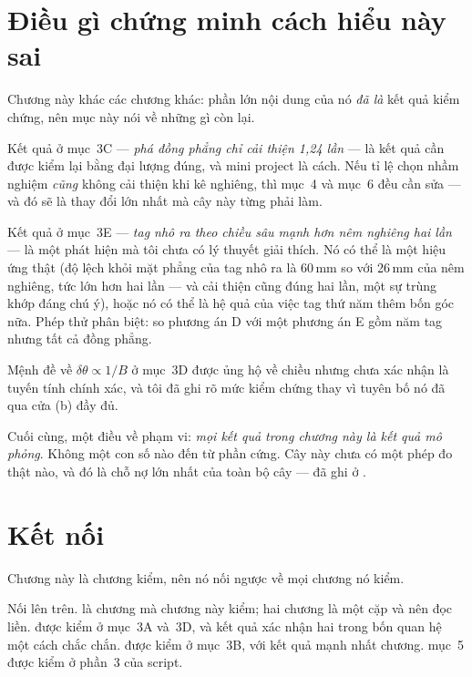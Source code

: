 \documentclass[../../marker.tex]{subfiles}
\begin{document}
\section{Điều gì chứng minh cách hiểu này sai}

Chương này khác các chương khác: phần lớn nội dung của nó \emph{đã là} kết quả kiểm chứng, nên mục này nói về những gì còn lại.

Kết quả ở mục~3C --- \emph{phá đồng phẳng chỉ cải thiện 1,24 lần} --- là kết quả cần được kiểm lại bằng đại lượng đúng, và mini project là cách. Nếu tỉ lệ chọn nhầm nghiệm \emph{cũng} không cải thiện khi kê nghiêng, thì  mục~4 và  mục~6 đều cần sửa --- và đó sẽ là thay đổi lớn nhất mà cây này từng phải làm.

Kết quả ở mục~3E --- \emph{tag nhô ra theo chiều sâu mạnh hơn nêm nghiêng hai lần} --- là một phát hiện mà tôi chưa có lý thuyết giải thích. Nó có thể là một hiệu ứng thật (độ lệch khỏi mặt phẳng của tag nhô ra là 60\,mm so với 26\,mm của nêm nghiêng, tức lớn hơn hai lần --- và cải thiện cũng đúng hai lần, một sự trùng khớp đáng chú ý), hoặc nó có thể là hệ quả của việc tag thứ năm thêm bốn góc nữa. Phép thử phân biệt: so phương án D với một phương án E gồm năm tag nhưng tất cả đồng phẳng.

Mệnh đề về \(\delta\theta \propto 1/B\) ở mục~3D được ủng hộ về chiều nhưng chưa xác nhận là tuyến tính chính xác, và tôi đã ghi rõ mức kiểm chứng thay vì tuyên bố nó đã qua cửa (b) đầy đủ.

Cuối cùng, một điều về phạm vi: \emph{mọi kết quả trong chương này là kết quả mô phỏng}. Không một con số nào đến từ phần cứng. Cây này chưa có một phép đo thật nào, và đó là chỗ nợ lớn nhất của toàn bộ cây --- đã ghi ở .

\section{Kết nối}

Chương này là chương kiểm, nên nó nối ngược về mọi chương nó kiểm.

Nối lên trên.  là chương mà chương này kiểm; hai chương là một cặp và nên đọc liền.  được kiểm ở mục~3A và~3D, và kết quả xác nhận hai trong bốn quan hệ một cách chắc chắn.  được kiểm ở mục~3B, với kết quả mạnh nhất chương.  mục~5 được kiểm ở phần~3 của script.
\end{document}
